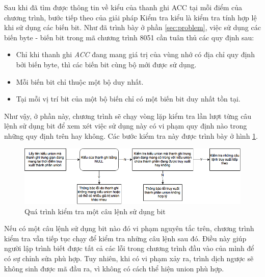 Sau khi đã tìm được thông tin về kiểu của thanh ghi ACC tại mỗi điểm của chương trình, bước tiếp theo của giải pháp Kiểm tra kiểu là kiểm tra tính hợp lệ khi sử dụng các biến bit. Như đã trình bày ở phần \ref{sec:problem}, việc sử dụng các biến byte - biến bit trong mã chương trình 8051 cần tuân thủ các quy định sau:
\begin{itemize}
	\item Chỉ khi thanh ghi \textit{ACC} đang mang giá trị của vùng nhớ có địa chỉ quy định bởi biến byte, thì các biến bit cùng bộ mới được sử dụng.
	\item Mỗi biến bit chỉ thuộc một bộ duy nhất. 
	\item Tại mỗi vị trí bit của một bộ biến chỉ có một biến bit duy nhất tồn tại. 
\end{itemize}
Như vậy, ở phần này, chương trình sẽ chạy vòng lặp kiểm tra lần lượt từng câu lệnh sử dụng bit để xem xét việc sử dụng này có vi phạm quy định nào trong những quy định trên hay không. Các bước kiểm tra này được trình bày ở hình \ref{fig:checkunionsteps}.
\begin{figure}
	\centering
	\includegraphics[width=0.7\linewidth]{image/checkUnionSteps}
	\caption{Quá trình kiểm tra một câu lệnh sử dụng bit}
	\label{fig:checkunionsteps}
\end{figure}
Nếu có một câu lệnh sử dụng bit nào đó vi phạm nguyên tắc trên, chương trình kiểm tra vẫn tiếp tục chạy để kiểm tra những câu lệnh sau đó. Điều này giúp người lập trình biết được tất cả các lỗi trong chương trình đầu vào của mình để có sự chỉnh sửa phù hợp. Tuy nhiên, khi có vi phạm xảy ra, trình dịch ngược sẽ không sinh được mã đầu ra, vì không có cách thể hiện union phù hợp.

